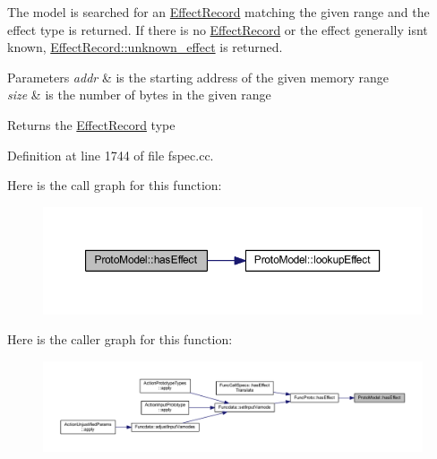 The model is searched for an \mbox{\hyperlink{class_effect_record}{Effect\+Record}} matching the given range and the effect type is returned. If there is no \mbox{\hyperlink{class_effect_record}{Effect\+Record}} or the effect generally isn\textquotesingle{}t known, \mbox{\hyperlink{class_effect_record_a9a77875d39274819c56d6e4df5f23ab0a02697f294ad0f4b53317da792c577a10}{Effect\+Record\+::unknown\+\_\+effect}} is returned. 
\begin{DoxyParams}{Parameters}
{\em addr} & is the starting address of the given memory range \\
\hline
{\em size} & is the number of bytes in the given range \\
\hline
\end{DoxyParams}
\begin{DoxyReturn}{Returns}
the \mbox{\hyperlink{class_effect_record}{Effect\+Record}} type 
\end{DoxyReturn}


Definition at line 1744 of file fspec.\+cc.

Here is the call graph for this function\+:
\nopagebreak
\begin{figure}[H]
\begin{center}
\leavevmode
\includegraphics[width=350pt]{class_proto_model_a5bd9f07bc75fc5f2497f1d4de685a8cf_cgraph}
\end{center}
\end{figure}
Here is the caller graph for this function\+:
\nopagebreak
\begin{figure}[H]
\begin{center}
\leavevmode
\includegraphics[width=350pt]{class_proto_model_a5bd9f07bc75fc5f2497f1d4de685a8cf_icgraph}
\end{center}
\end{figure}
\mbox{\label{class_proto_model_aace107c2668bbd0091159f5c9e5a9042}} 
